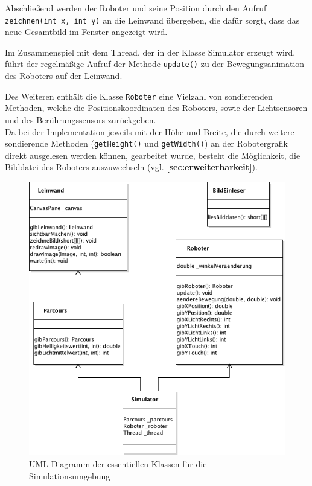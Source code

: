 \documentclass[paper=a4, DIV=calc, BCOR=12mm, twoside=on, onecolumn=on, open = right, titlepage =on, parskip =half-, headsepline = on, footsepline = off, chapterprefix = off, appendixprefix = on, fontsize = 12pt, numbers = noenddot, abstract = on]{scrbook}
\begin{document}
Abschließend werden der Roboter und seine Position durch den Aufruf \texttt{zeich\-nen(int x, int y)} an die Leinwand übergeben, die dafür sorgt, dass das neue Gesamtbild im Fenster angezeigt wird.

Im Zusammenspiel mit dem Thread, der in der Klasse Simulator erzeugt wird, führt der regelmäßige Aufruf der Methode \texttt{update()} zu der Bewegungsanimation des Roboters auf der Leinwand.


Des Weiteren enthält die Klasse \texttt{Roboter} eine Vielzahl von sondierenden Methoden, welche die Positionskoordinaten des Roboters, sowie der Lichtsensoren und des Berührungssensors zurückgeben.\\
Da bei der Implementation jeweils mit der Höhe und Breite, die durch weitere sondierende Methoden (\texttt{getHeight()} und \texttt{getWidth()}) an der Robotergrafik direkt ausgelesen werden können, gearbeitet wurde, besteht die Möglichkeit, die Bilddatei des Roboters auszuwechseln (vgl. \textbf{\ref{sec:erweiterbarkeit}}).

\begin{figure}[htbp]
\centering
\hspace{-2.5cm}\includegraphics[scale=0.75]{images/uml_simulator_essenz.png}
\caption[UML-Diagramm der Klassen des Simulators]{UML-Diagramm der essentiellen Klassen für die Simulationsumgebung}
\label{fig:simulator_uml}
\end{figure}
\end{document}
